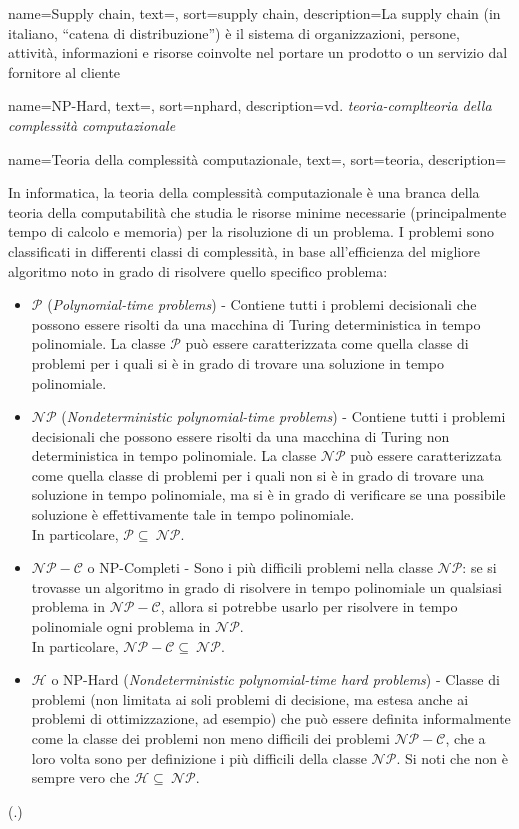 {
    name=Supply chain,
    text=,
    sort=supply chain,
    description={La supply chain (in italiano, ``catena di distribuzione'') è il sistema di organizzazioni, persone, attività, informazioni e risorse coinvolte nel portare un prodotto o un servizio dal fornitore al cliente}
}

{
    name=NP-Hard,
    text=,
    sort=nphard,
    description={vd. \emph{\gls{teoria-compl}teoria della complessità computazionale}\glsfirstoccur}
}

{
    name=Teoria della complessità computazionale,
    text=,
    sort=teoria,
    description={In informatica, la teoria della complessità computazionale è una branca della teoria della computabilità che studia le risorse minime necessarie (principalmente tempo di calcolo e memoria) per la risoluzione di un problema. I problemi sono classificati in differenti classi di complessità, in base all'efficienza del migliore algoritmo noto in grado di risolvere quello specifico problema:
    \begin{itemize}
        \item $\mathcal{P}$ (\textit{Polynomial-time problems}) - Contiene tutti i problemi decisionali che possono essere risolti da una macchina di Turing deterministica in tempo polinomiale. La classe $\mathcal{P}$ può essere caratterizzata come quella classe di problemi per i quali si è in grado di trovare una soluzione in tempo polinomiale.
        \item $\mathcal{NP}$ (\textit{Nondeterministic polynomial-time problems}) - Contiene tutti i problemi decisionali che possono essere risolti da una macchina di Turing non deterministica in tempo polinomiale. La classe $\mathcal{NP}$ può essere caratterizzata come quella classe di problemi per i quali non si è in grado di trovare una soluzione in tempo polinomiale, ma si è in grado di verificare se una possibile soluzione è effettivamente tale in tempo polinomiale. \\ In particolare, $\mathcal{P} \subseteq\ \mathcal{NP}$.
        \item $\mathcal{NP-C}$ o NP-Completi - Sono i più difficili problemi nella classe $\mathcal{NP}$: se si trovasse un algoritmo in grado di risolvere in tempo polinomiale un qualsiasi problema in $\mathcal{NP-C}$, allora si potrebbe usarlo per risolvere in tempo polinomiale ogni problema in $\mathcal{NP}$. \\ In particolare, $\mathcal{NP-C} \subseteq\ \mathcal{NP}$.
        \item $\mathcal{H}$ o NP-Hard (\textit{Nondeterministic polynomial-time hard problems}) -  Classe di problemi (non limitata ai soli problemi di decisione, ma estesa anche ai problemi di ottimizzazione, ad esempio) che può essere definita informalmente come la classe dei problemi non meno difficili dei problemi $\mathcal{NP-C}$, che a loro volta sono per definizione i più difficili della classe $\mathcal{NP}$. Si noti che non è sempre vero che $\mathcal{H} \subseteq\ \mathcal{NP}$.
    \end{itemize}
    (\cite{wiki:teoria-compl}.)
    }
}

